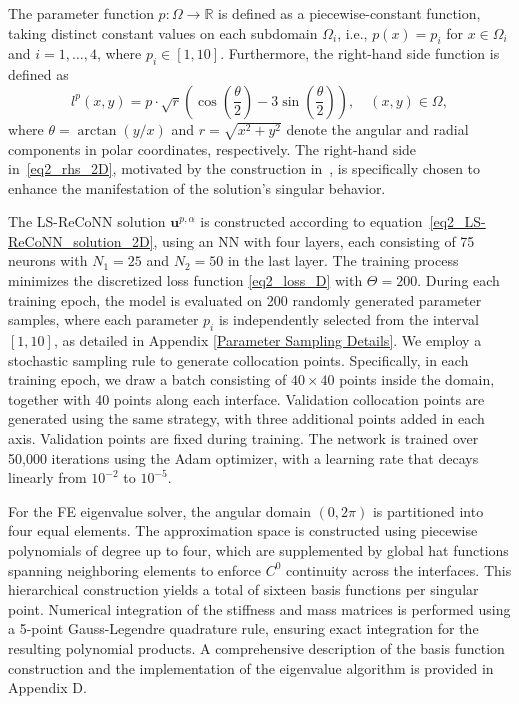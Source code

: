 \documentclass[oneside]{article}
\newcounter{reviewer}
\newcounter{point}[reviewer]
\begin{document}
\noindent
The parameter function \( p: \Omega \to \mathbb{R} \) is defined as a piecewise-constant function, taking distinct constant values on each subdomain \( \Omega_i \), i.e., $p(x) = p_i$ for $x \in \Omega_i$ and $i = 1, \ldots, 4$, where \( p_i \in [1, 10] \). Furthermore, the right-hand side function is defined as
\begin{equation}\label{eq2_rhs_2D}
    l^p(x, y) = p \cdot \sqrt{r} \left( \cos\left(\frac{\theta}{2}\right) -3 \sin\left(\frac{\theta}{2}\right)  \right), \quad (x, y) \in \Omega,
\end{equation}
where \( \theta = \arctan(y/x) \) and \( r = \sqrt{x^2 + y^2} \) denote the angular and radial components in polar coordinates, respectively. The right-hand side in~\eqref{eq2_rhs_2D}, motivated by the construction in~\cite{brenner2008mathematical}, is specifically chosen to enhance the manifestation of the solution’s singular behavior.

\noindent The LS-ReCoNN solution \( \mathbf{u}^{p, \alpha} \) is constructed according to equation~\eqref{eq2_LS-ReCoNN_solution_2D}, using an NN with four layers, each consisting of 75 neurons with $N_1 = 25$ and $N_2 = 50$ in the last layer. The training process minimizes the discretized loss function \eqref{eq2_loss_D} with $\Theta = 200$. During each training epoch, the model is evaluated on 200 randomly generated parameter samples, where each parameter \( p_i \) is independently selected from the interval \( [1, 10] \), as detailed in Appendix \ref{Parameter Sampling Details}. We employ a stochastic sampling rule to generate collocation points.  Specifically, in each training epoch, we draw a batch consisting of $40 \times 40$ points inside the domain, together with 40 points along each interface.  Validation collocation points are generated using the same strategy, with three additional points added in each axis. Validation points are fixed during training. The network is trained over 50,000 iterations using the Adam optimizer, with a learning rate that decays linearly from \( 10^{-2} \) to \( 10^{-5} \).

{\noindent For the FE eigenvalue solver, the angular domain $(0, 2\pi)$ is partitioned into four equal elements. The approximation space is constructed using piecewise polynomials of degree up to four, which are supplemented by global hat functions spanning neighboring elements to enforce $C^{0}$ continuity across the interfaces. This hierarchical construction yields a total of sixteen basis functions per singular point. Numerical integration of the stiffness and mass matrices is performed using a 5-point Gauss-Legendre quadrature rule, ensuring exact integration for the resulting polynomial products. A comprehensive description of the basis function construction and the implementation of the eigenvalue algorithm is provided in Appendix D.}
\end{document}
